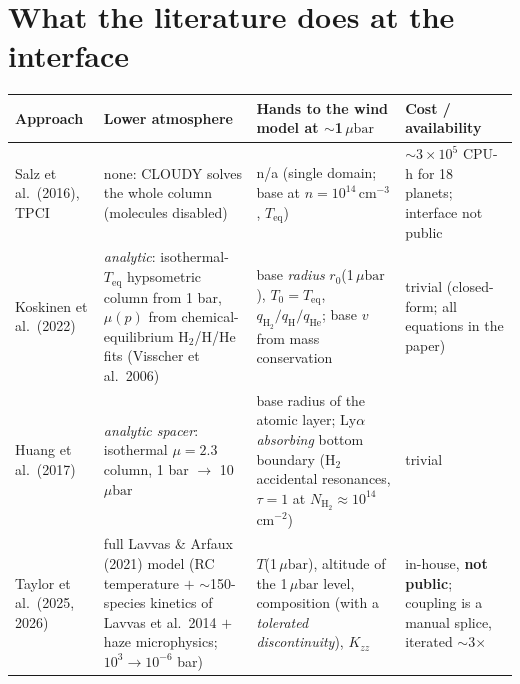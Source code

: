 \documentclass[english,a4paper]{my_memo}
\newcommand{\ubar}{\mu\mathrm{bar}}
\newcommand{\qHH}{q_{\mathrm{H_2}}}
\begin{document}
\section{What the literature does at the interface}

\begin{table}[h]\centering\small
\begin{tabular}{@{}p{2.5cm}p{4.2cm}p{4.4cm}p{3.6cm}@{}}
\toprule
Approach & Lower atmosphere & Hands to the wind model at $\sim$1\,$\ubar$ & Cost / availability \\
\midrule
Salz et al.\ (2016), TPCI & none: CLOUDY solves the whole column (molecules disabled) &
  n/a (single domain; base at $n=10^{14}$\,cm$^{-3}$, $T_\mathrm{eq}$) &
  $\sim$$3\times10^{5}$ CPU-h for 18 planets; interface not public \\
Koskinen et al.\ (2022) & \emph{analytic}: isothermal-$T_\mathrm{eq}$ hypsometric column from
  1 bar, $\mu(p)$ from chemical-equilibrium H$_2$/H/He fits (Visscher et al.\ 2006) &
  base \emph{radius} $r_0$(1\,$\ubar$), $T_0{=}T_\mathrm{eq}$, $\qHH/q_\mathrm{H}/q_\mathrm{He}$;
  base $v$ from mass conservation & trivial (closed-form; all equations in the paper) \\
Huang et al.\ (2017) & \emph{analytic spacer}: isothermal $\mu{=}2.3$ column, 1 bar $\to$ 10\,$\ubar$ &
  base radius of the atomic layer; Ly$\alpha$ \emph{absorbing} bottom boundary
  (H$_2$ accidental resonances, $\tau{=}1$ at $N_\mathrm{H_2}{\approx}10^{14}$\,cm$^{-2}$) & trivial \\
Taylor et al.\ (2025, 2026) & full Lavvas \& Arfaux (2021) model (RC temperature $+$
  $\sim$150-species kinetics of Lavvas et al.\ 2014 $+$ haze microphysics;
  $10^{3}\to10^{-6}$ bar) & $T$(1\,$\ubar$), altitude of the 1\,$\ubar$ level, composition
  (with a \emph{tolerated discontinuity}), $K_{zz}$ & in-house, \textbf{not public};
  coupling is a manual splice, iterated $\sim$3$\times$ \\
\bottomrule
\end{tabular}
\end{table}
\end{document}
